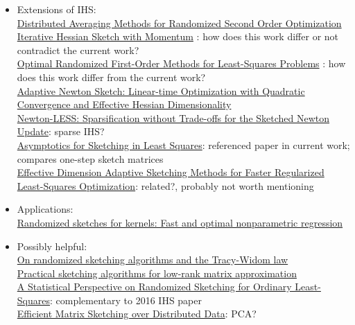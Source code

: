 \documentclass[10pt]{article}
\begin{document}
\begin{itemize}

\item
Extensions of IHS: \\
\href{https://arxiv.org/pdf/2002.06540.pdf}{Distributed Averaging Methods for Randomized Second Order Optimization} \\
\href{https://ieeexplore.ieee.org/document/8682720}{Iterative Hessian Sketch with Momentum} \todo: how does this work differ or not contradict the current work? \\
\href{https://proceedings.mlr.press/v119/lacotte20a/lacotte20a.pdf}{Optimal Randomized First-Order Methods for Least-Squares Problems} \todo: how does this work differ from the current work? \\
\href{https://arxiv.org/pdf/2105.07291.pdf}{Adaptive Newton Sketch: Linear-time Optimization with Quadratic Convergence and Effective Hessian Dimensionality} \\
\href{https://arxiv.org/pdf/2107.07480.pdf}{Newton-LESS: Sparsification without Trade-offs for the Sketched Newton Update}: sparse IHS? \\
\href{https://proceedings.neurips.cc/paper/2019/file/1f36c15d6a3d18d52e8d493bc8187cb9-Paper.pdf}{Asymptotics for Sketching in Least Squares}: referenced paper in current work; compares one-step sketch matrices \\
\href{https://arxiv.org/pdf/2006.05874.pdf}{Effective Dimension Adaptive Sketching Methods for Faster Regularized Least-Squares Optimization}: related?, probably not worth mentioning

\item
Applications: \\
\href{https://projecteuclid.org/journals/annals-of-statistics/volume-45/issue-3/Randomized-sketches-for-kernels-Fast-and-optimal-nonparametric-regression/10.1214/16-AOS1472.full}{Randomized sketches for kernels: Fast and optimal nonparametric regression}

\item
Possibly helpful: \\
\href{https://arxiv.org/pdf/2201.00450.pdf}{On randomized sketching algorithms and the Tracy-Widom law} \\
\href{https://arxiv.org/pdf/1609.00048.pdf}{Practical sketching algorithms for low-rank matrix approximation} \\
\href{https://www.jmlr.org/papers/volume17/15-440/15-440.pdf}{A Statistical Perspective on Randomized Sketching for Ordinary Least-Squares}: complementary to 2016 IHS paper \\
\href{https://dl.acm.org/doi/10.1145/3034786.3056119}{Efficient Matrix Sketching over Distributed Data}: PCA?

\end{itemize}



\newpage



\end{document}
